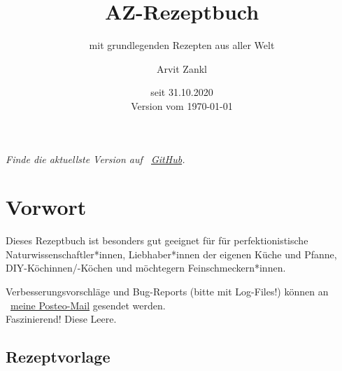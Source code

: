 \documentclass[a4paper, 12pt]{scrbook} 								%
\title{AZ-Rezeptbuch}
\subtitle{mit grundlegenden Rezepten aus aller Welt}
\author{Arvit Zankl}
\date{seit 31.10.2020  \\\vspace{1cm} Version vom \today}
\numberwithin{equation}{section} 									%
\begin{document}
\maketitle
\vspace{1cm}
\textit{Finde die aktuellste Version auf \ \href{https://github.com/ArvitZ/AZ-Rezeptsammlung}{GitHub}. }

\thispagestyle{empty}	%
\tableofcontents




\chapter{Vorwort}
	\setcounter{page}{1}
	Dieses Rezeptbuch ist besonders gut geeignet für für perfektionistische Naturwissenschaftler*innen, Liebhaber*innen der eigenen Küche und Pfanne, DIY-Köchinnen/-Köchen und möchtegern Feinschmeckern*innen.

	Verbesserungsvorschläge und Bug-Reports (bitte mit Log-Files!) können an \ \href{mailto:fla8za1@posteo.org}{meine Posteo-Mail} gesendet werden. 
\\
	Faszinierend! Diese Leere.
	\newpage



\section{Rezeptvorlage}	\label{Rezeptlabel}
\end{document}
